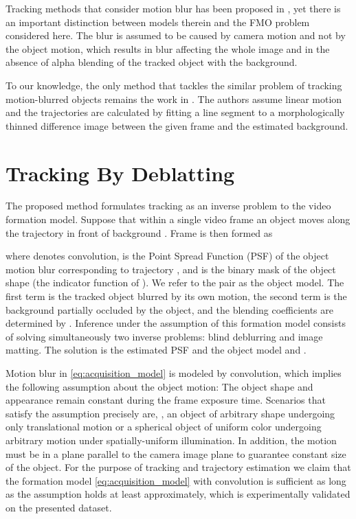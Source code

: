 \documentclass[10pt,twocolumn,letterpaper]{article}
\begin{document}
Tracking methods that consider motion blur has been proposed in \cite{Wu2011,Seibold2017,Ma2016}, yet there is an important distinction between models therein and the FMO problem considered here. The blur is assumed to be caused by camera motion and not by the object motion, which results in blur affecting the whole image and in the absence of alpha blending of the tracked object with the background.

To our knowledge, the only method that tackles the similar problem of tracking motion-blurred objects remains the work in \cite{fmo}. The authors assume linear motion and the trajectories are calculated by fitting a line segment to a morphologically thinned difference image between the given frame and the estimated background. 

 
\section{Tracking By Deblatting}
\label{sec:TbD_overview}


The proposed method formulates tracking as an inverse problem to the video formation model. Suppose that within a single video frame  an object  moves along the trajectory  in front of background . Frame  is then formed as

where  denotes convolution,  is the Point Spread Function (PSF) of the object motion blur corresponding to trajectory , and  is the binary mask of the object shape (\ie the indicator function of ). We refer to the pair   as the object model. 
The first term is the tracked object blurred by its own motion, the second term is the background partially occluded by the object, and the blending coefficients are determined by .
Inference under the assumption of this formation model consists of solving simultaneously two inverse problems:
blind deblurring and image matting. The solution is the estimated PSF  and the object model  and .

Motion blur in \eqref{eq:acquisition_model} is modeled by convolution, which implies the following assumption about the object motion: The object shape and appearance remain constant during the frame exposure time. Scenarios that satisfy the assumption precisely are, \eg, an object of arbitrary shape undergoing only translational motion or a spherical object of uniform color undergoing arbitrary motion under spatially-uniform illumination. In addition, the motion must be in a plane parallel to the camera image plane to guarantee constant size of the object. For the purpose of tracking and trajectory estimation we claim that the formation model \eqref{eq:acquisition_model} with convolution is sufficient as long as the assumption holds at least approximately, which is experimentally validated on the presented dataset. 
\end{document}
